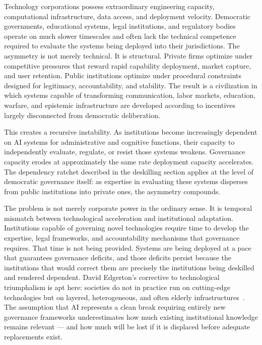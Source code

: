 \documentclass[12pt, a4paper]{article}
\theoremstyle{remark}
\begin{document}
Technology corporations possess extraordinary engineering capacity, computational infrastructure, data access, and deployment velocity. Democratic governments, educational systems, legal institutions, and regulatory bodies operate on much slower timescales and often lack the technical competence required to evaluate the systems being deployed into their jurisdictions. The asymmetry is not merely technical. It is structural. Private firms optimize under competitive pressures that reward rapid capability deployment, market capture, and user retention. Public institutions optimize under procedural constraints designed for legitimacy, accountability, and stability. The result is a civilization in which systems capable of transforming communication, labor markets, education, warfare, and epistemic infrastructure are developed according to incentives largely disconnected from democratic deliberation.

This creates a recursive instability. As institutions become increasingly dependent on AI systems for administrative and cognitive functions, their capacity to independently evaluate, regulate, or resist those systems weakens. Governance capacity erodes at approximately the same rate deployment capacity accelerates. The dependency ratchet described in the deskilling section applies at the level of democratic governance itself: as expertise in evaluating these systems disperses from public institutions into private ones, the asymmetry compounds.

The problem is not merely corporate power in the ordinary sense. It is temporal mismatch between technological acceleration and institutional adaptation. Institutions capable of governing novel technologies require time to develop the expertise, legal frameworks, and accountability mechanisms that governance requires. That time is not being provided. Systems are being deployed at a pace that guarantees governance deficits, and those deficits persist because the institutions that would correct them are precisely the institutions being deskilled and rendered dependent. David Edgerton's corrective to technological triumphalism is apt here: societies do not in practice run on cutting-edge technologies but on layered, heterogeneous, and often elderly infrastructures~\cite{Edgerton2006}. The assumption that AI represents a clean break requiring entirely new governance frameworks underestimates how much existing institutional knowledge remains relevant --- and how much will be lost if it is displaced before adequate replacements exist.
\end{document}
